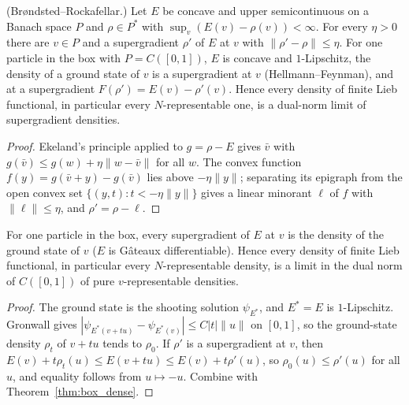 \begin{theorem}
  \label{thm:box_dense}
  \leanok
  (Brøndsted--Rockafellar.) Let $E$ be concave and upper semicontinuous on a Banach space $P$ and $\rho\in P^*$ with
  $\sup_v(E(v)-\rho(v))<\infty$. For every $\eta>0$ there are $v\in P$ and a supergradient $\rho'$ of $E$ at $v$ with
  $\|\rho'-\rho\|\le\eta$. For one particle in the box with $P=C([0,1])$, $E$ is concave and $1$-Lipschitz, the density of
  a ground state of $v$ is a supergradient at $v$ (Hellmann--Feynman), and at a supergradient $F(\rho')=E(v)-\rho'(v)$.
  Hence every density of finite Lieb functional, in particular every $N$-representable one, is a dual-norm limit of
  supergradient densities.
\end{theorem}
\begin{proof}
  \leanok
  Ekeland's principle applied to $g=\rho-E$ gives $\bar v$ with $g(\bar v)\le g(w)+\eta\|w-\bar v\|$ for all $w$. The convex
  function $f(y)=g(\bar v+y)-g(\bar v)$ lies above $-\eta\|y\|$; separating its epigraph from the open convex set
  $\{(y,t):t<-\eta\|y\|\}$ gives a linear minorant $\ell$ of $f$ with $\|\ell\|\le\eta$, and $\rho'=\rho-\ell$.
\end{proof}

\begin{theorem}
  \label{thm:box_vrep_dense}
  \leanok
  For one particle in the box, every supergradient of $E$ at $v$ is the density of the ground state of $v$ ($E$ is
  G\^ateaux differentiable). Hence every density of finite Lieb functional, in particular every $N$-representable
  density, is a limit in the dual norm of $C([0,1])$ of pure $v$-representable densities.
\end{theorem}
\begin{proof}
  \leanok
  The ground state is the shooting solution $\psi_{E^*}$, and $E^*=E$ is $1$-Lipschitz. Gronwall gives
  $|\psi_{E^*(v+tu)}-\psi_{E^*(v)}|\le C|t|\|u\|$ on $[0,1]$, so the ground-state density $\rho_t$ of $v+tu$ tends to
  $\rho_0$. If $\rho'$ is a supergradient at $v$, then $E(v)+t\rho_t(u)\le E(v+tu)\le E(v)+t\rho'(u)$, so
  $\rho_0(u)\le\rho'(u)$ for all $u$, and equality follows from $u\mapsto-u$. Combine with Theorem~\ref{thm:box_dense}.
\end{proof}

